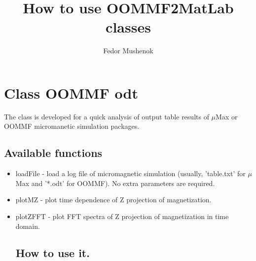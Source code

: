 \documentclass[14pt,a4paper] {article}
\begin{document}
\title{How to use OOMMF2MatLab classes}
\author{Fedor Mushenok}
\maketitle

\section{Class OOMMF odt}
 The class is developed for a quick analysis of output table results of $\mu$Max or OOMMF micromanetic simulation packages.

\subsection{Available functions}
\begin{itemize}
\item loadFile - load a log file of micromagnetic simulation (usually, 'table.txt' for $\mu$Max and '*.odt' for OOMMF). No extra parameters are required. 

\item plotMZ - plot time dependence of Z projection of magnetization.

\item plotZFFT - plot FFT spectra of Z projection of magnetization in time domain. 

\subsection{How to use it.} 

\end{itemize}
 
 
\end{document}
